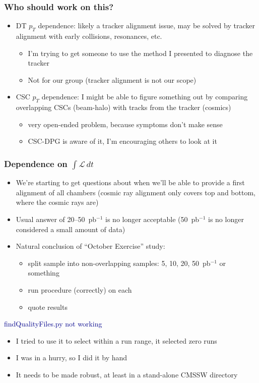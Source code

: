 \documentclass[compress]{beamer}
\begin{document}
\begin{frame}
\frametitle{Who should work on this?}
\begin{itemize}\setlength{\itemsep}{0.5 cm}
\item DT $p_T$ dependence: likely a tracker alignment issue, may be
  solved by tracker alignment with early collisions, resonances, etc.
\begin{itemize}
\item I'm trying to get someone to use the method I presented to
  diagnose the tracker
\item Not for our group (tracker alignment is not our scope)
\end{itemize}
\item CSC $p_T$ dependence: I might be able to figure something out by
  comparing overlapping CSCs (beam-halo) with tracks from the tracker
  (cosmics)
\begin{itemize}
\item very open-ended problem, because symptoms don't make sense
\item CSC-DPG is aware of it, I'm encouraging others to look at it
\end{itemize}
\end{itemize}
\end{frame}

\begin{frame}
\frametitle{Dependence on $\int \mathcal{L} \, dt$}
\begin{itemize}\setlength{\itemsep}{0.1 cm}
\item We're starting to get questions about when we'll be able to
  provide a first alignment of all chambers (cosmic ray alignment only
  covers top and bottom, where the cosmic rays are)
\item Usual answer of 20--50~pb$^{-1}$ is no longer acceptable
  (50~pb$^{-1}$ is no longer considered a small amount of data)
\item Natural conclusion of ``October Exercise'' study:
\begin{itemize}
\item split sample into non-overlapping samples: 5, 10, 20, 50~pb$^{-1}$ or something
\item run procedure (correctly) on each
\item quote results
\end{itemize}
\end{itemize}

\vfill
\hspace{-0.83 cm} \textcolor{darkblue}{\Large findQualityFiles.py not working}
\begin{itemize}\setlength{\itemsep}{0.1 cm}
\item I tried to use it to select within a run range, it selected zero runs
\item I was in a hurry, so I did it by hand
\item It needs to be made robust, at least in a stand-alone CMSSW directory
\end{itemize}
\end{frame}
\end{document}

